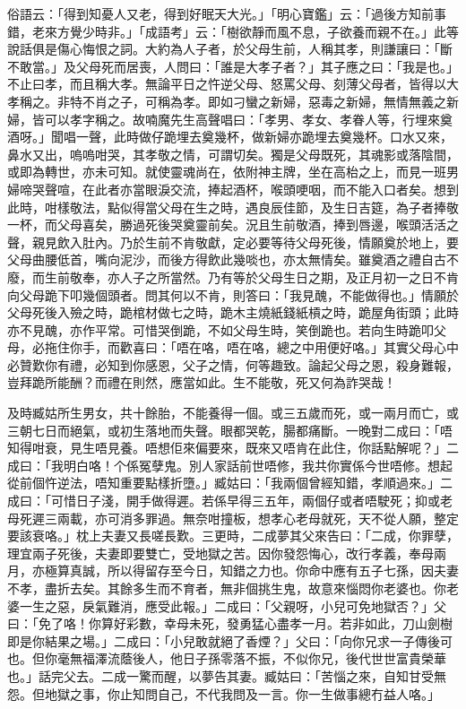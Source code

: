 \documentclass[a5paper, 12pt, openany]{book} %
\begin{document}
	俗語云：「得到知憂人又老，得到好眠天大光。」「明心寶鑑」云：「過後方知前事錯，老來方覺少時非。」「成語考」云：「樹欲靜而風不息，子欲養而親不在。」此等說話俱是傷心悔恨之詞。大約為人子者，於父母生前，人稱其孝，則謙讓曰：「斷不敢當。」及父母死而居喪，人問曰：「誰是大孝子者？」其子應之曰：「我是也。」不止曰孝，而且稱大孝。無論平日之忤逆父母、怒罵父母、刻薄父母者，皆得以大孝稱之。非特不肖之子，可稱為孝。即如刁蠻之新婦，惡毒之新婦，無情無義之新婦，皆可以孝字稱之。故喃魔先生高聲唱曰：「孝男、孝女、孝眷人等，行埋來奠酒呀。」聞唱一聲，此時做仔跪埋去奠幾杯，做新婦亦跪埋去奠幾杯。口水又來，鼻水又出，嗚嗚咁哭，其孝敬之情，可謂切矣。獨是父母既死，其魂影或落陰間，或即為轉世，亦未可知。就使靈魂尚在，依附神主牌，坐在高枱之上，而見一班男婦啼哭聲喧，在此者亦當眼淚交流，捧起酒杯，喉頭哽咽，而不能入口者矣。想到此時，咁樣敬法，點似得當父母在生之時，遇良辰佳節，及生日吉筵，為子者捧敬一杯，而父母喜矣，勝過死後哭奠靈前矣。況且生前敬酒，捧到唇邊，喉頭活活之聲，親見飲入肚內。乃於生前不肯敬獻，定必要等待父母死後，情願奠於地上，要父母曲腰低首，嘴向泥沙，而後方得飲此幾啖也，亦太無情矣。雖奠酒之禮自古不廢，而生前敬奉，亦人子之所當然。乃有等於父母生日之期，及正月初一之日不肯向父母跪下叩幾個頭者。問其何以不肯，則答曰：「我見醜，不能做得也。」情願於父母死後入殮之時，跪棺材做七之時，跪木主燒紙錢紙槓之時，跪屋角街頭；此時亦不見醜，亦作平常。可惜哭倒跪，不如父母生時，笑倒跪也。若向生時跪叩父母，必拖住你手，而歡喜曰：「唔在咯，唔在咯，總之中用便好咯。」其實父母心中必贊歎你有禮，必知到你感恩，父子之情，何等趣致。論起父母之恩，殺身難報，豈拜跪所能酬？而禮在則然，應當如此。生不能敬，死又何為詐哭哉！

	及時臧姑所生男女，共十餘胎，不能養得一個。或三五歲而死，或一兩月而亡，或三朝七日而絕氣，或初生落地而失聲。眼都哭乾，腸都痛斷。一晚對二成曰：「唔知得咁衰，見生唔見養。唔想佢來偏要來，既來又唔肯在此住，你話點解呢？」二成曰：「我明白咯！个係冤孽鬼。別人家話前世唔修，我共你實係今世唔修。想起從前個忤逆法，唔知重要點樣折墮。」臧姑曰：「我兩個曾經知錯，孝順過來。」二成曰：「可惜日子淺，開手做得遲。若係早得三五年，兩個仔或者唔駛死；抑或老母死遲三兩載，亦可消多罪過。無奈咁撞板，想孝心老母就死，天不從人願，整定要該衰咯。」枕上夫妻又長嗟長歎。三更時，二成夢其父來告曰：「二成，你罪孽，理宜兩子死後，夫妻即要雙亡，受地獄之苦。因你發怨悔心，改行孝義，奉母兩月，亦極算真誠，所以得留存至今日，知錯之力也。你命中應有五子七孫，因夫妻不孝，盡折去矣。其餘多生而不育者，無非個挑生鬼，故意來惱悶你老婆也。你老婆一生之惡，戾氣難消，應受此報。」二成曰：「父親呀，小兒可免地獄否？」父曰：「免了咯！你算好彩數，幸母未死，發勇猛心盡孝一月。若非如此，刀山劍樹即是你結果之場。」二成曰：「小兒敢就絕了香煙？」父曰：「向你兄求一子傳後可也。但你毫無福澤流蔭後人，他日子孫零落不振，不似你兄，後代世世富貴榮華也。」話完父去。二成一驚而醒，以夢告其妻。臧姑曰：「苦惱之來，自知甘受無怨。但地獄之事，你止知問自己，不代我問及一言。你一生做事總冇益人咯。」
\end{document}
